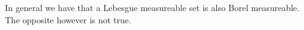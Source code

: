 In general we have that a Lebesgue measureable set is also Borel measureable.
The opposite however is not true.



